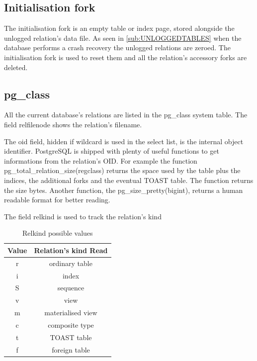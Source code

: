 \subsection{Initialisation fork}
The initialisation fork is an empty table or index page, stored alongside the 
unlogged relation's data file. As seen in \ref{sub:UNLOGGEDTABLES} when the 
database performs a crash recovery the unlogged relations are zeroed. The 
initialisation fork is used to reset them and all the relation's accessory 
forks are deleted.

\subsection{pg\_class}
All the current database's relations are listed in the 
pg\_class system table. The 
field relfilenode shows the relation's filename. \newline

The oid field, hidden if wildcard is used in the select list, is the internal 
object identifier. 
PostgreSQL is shipped with plenty of useful functions to get informations from 
the relation's OID. For example the function 
pg\_total\_relation\_size(regclass) returns the space used by the 
table plus the indices, the additional forks and the eventual TOAST table.
The function returns the size bytes. Another function, the 
pg\_size\_pretty(bigint), returns a human readable format for better 
reading.\newline

The field relkind is used to track the relation's kind

\begin{table}[h]
  \begin{tabular}{cc}
    Value & Relation's kind 
Read\\ 
    \hline
    r  &  ordinary table \\
    i  &  index \\
    S  &  sequence \\
    v  &  view \\
    m  &  materialised view \\
    c  &  composite type \\
    t  &  TOAST table \\
    f  &  foreign table \\
    
  \end{tabular}
  \caption{\label{tab:RELKIND}Relkind possible values}
\end{table}

